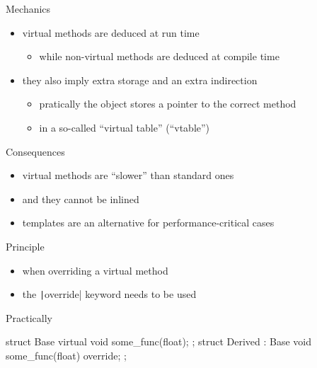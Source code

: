 \begin{frame}[fragile]
  \begin{block}{Mechanics}
    \begin{itemize}
    \item virtual methods are deduced at run time
      \begin{itemize}
      \item while non-virtual methods are deduced at compile time
      \end{itemize}
    \item they also imply extra storage and an extra indirection
      \begin{itemize}
      \item pratically the object stores a pointer to the correct method
      \item in a so-called ``virtual table'' (``vtable'')
      \end{itemize}
    \end{itemize}
  \end{block}
  \begin{alertblock}{Consequences}
    \begin{itemize}
    \item virtual methods are ``slower'' than standard ones
    \item and they cannot be inlined
    \item templates are an alternative for performance-critical cases
    \end{itemize}
  \end{alertblock}
\end{frame}

\begin{frame}[fragile]
  \begin{block}{Principle}
    \begin{itemize}
    \item when overriding a virtual method
    \item the \texttt|override| keyword needs to be used
    \end{itemize}
  \end{block}
  \begin{exampleblock}{Practically}
    \begin{cppcode}
      struct Base {
        virtual void some_func(float);
      };
      struct Derived : Base {
        void some_func(float) override;
      };
    \end{cppcode}
  \end{exampleblock}
\end{frame}

